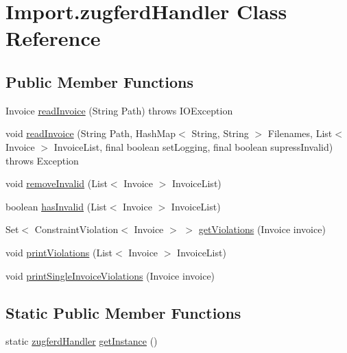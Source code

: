 \hypertarget{class_import_1_1zugferd_handler}{}\section{Import.\+zugferd\+Handler Class Reference}
\label{class_import_1_1zugferd_handler}
\subsection*{Public Member Functions}
\begin{DoxyCompactItemize}
\item 
Invoice \hyperlink{class_import_1_1zugferd_handler_aea79c23595f003c943e908c95276ecf9}{read\+Invoice} (String Path)  throws I\+O\+Exception
\item 
void \hyperlink{class_import_1_1zugferd_handler_abd148f2b6346f1d0942b06e7941124be}{read\+Invoice} (String Path, Hash\+Map$<$ String, String $>$ Filenames, List$<$ Invoice $>$ Invoice\+List, final boolean set\+Logging, final boolean supress\+Invalid)  throws Exception 
\item 
void \hyperlink{class_import_1_1zugferd_handler_aa5fbab8b4a7835f2b13167452f9d17db}{remove\+Invalid} (List$<$ Invoice $>$ Invoice\+List)
\item 
boolean \hyperlink{class_import_1_1zugferd_handler_a6999d186193b120650a5d24a49d10c6c}{has\+Invalid} (List$<$ Invoice $>$ Invoice\+List)
\item 
Set$<$ Constraint\+Violation$<$ Invoice $>$ $>$ \hyperlink{class_import_1_1zugferd_handler_acf26740b73f820812fadb01ccf712dd2}{get\+Violations} (Invoice invoice)
\item 
void \hyperlink{class_import_1_1zugferd_handler_ae8ae1fcc05ebddf4d2b53c8daeda7b00}{print\+Violations} (List$<$ Invoice $>$ Invoice\+List)
\item 
void \hyperlink{class_import_1_1zugferd_handler_aadb33b773805373add19d92eb713831b}{print\+Single\+Invoice\+Violations} (Invoice invoice)
\end{DoxyCompactItemize}
\subsection*{Static Public Member Functions}
\begin{DoxyCompactItemize}
\item 
static \hyperlink{class_import_1_1zugferd_handler}{zugferd\+Handler} \hyperlink{class_import_1_1zugferd_handler_ad3acd84340c8a5fcb2c01a2636979786}{get\+Instance} ()
\end{DoxyCompactItemize}


